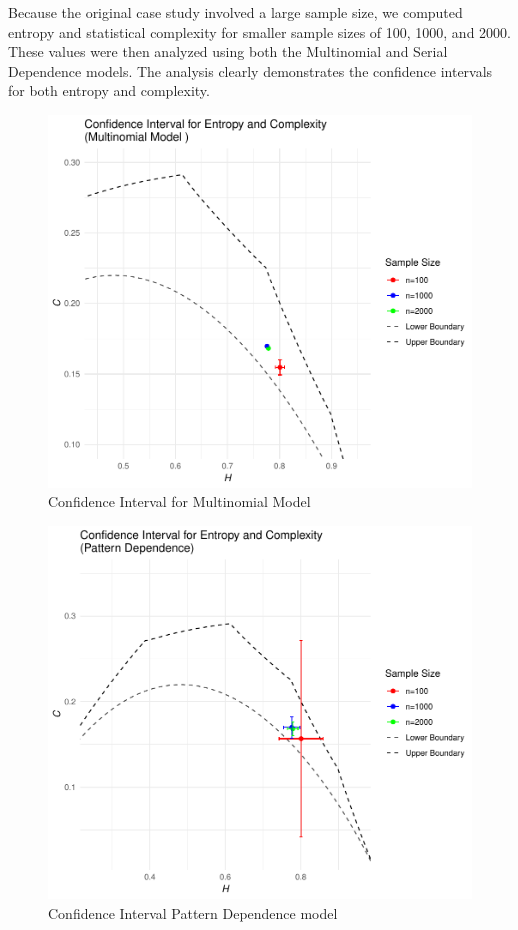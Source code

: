 Because the original case study involved a large sample size, we computed entropy and statistical complexity for smaller sample sizes of 100, 1000, and 2000. These values were then analyzed using both the Multinomial and Serial Dependence models. The analysis clearly demonstrates the confidence intervals for both entropy and complexity.	

\begin{figure}[H]
	\centering
	\includegraphics[width=0.8 \textwidth]{CI for Multinomial model}
	\caption{Confidence Interval for Multinomial Model}
	\label{fig:CIMultinorm}
\end{figure}

\begin{figure}[H]
	\centering
	\includegraphics[width=0.7 \textwidth]{CI for pattern dependence}
	\caption{Confidence Interval Pattern Dependence model}
	\label{fig:CIDependence}
\end{figure}

